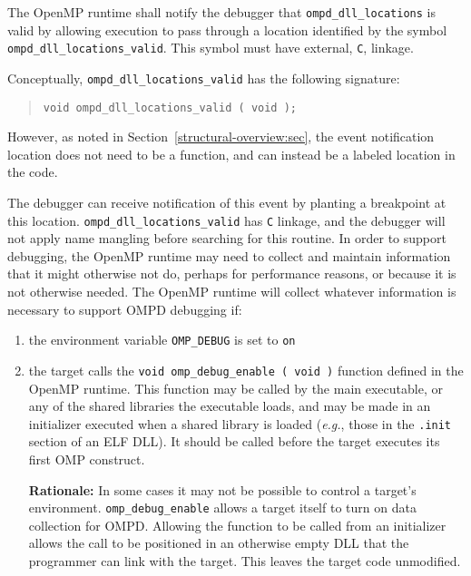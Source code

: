 The OpenMP runtime shall notify the debugger that
\texttt{ompd\_dll\_locations} is valid by allowing execution
to pass through a location identified by the symbol
\texttt{ompd\_dll\_locations\_valid}.
This symbol must have external, \texttt{C}, linkage.

Conceptually, \texttt{ompd\_dll\_locations\_valid} has the following
signature:
\begin{quote}
\begin{lstlisting}
void ompd_dll_locations_valid ( void );
\end{lstlisting}
\end{quote}
However, as noted in Section~\ref{structural-overview:sec},
the event notification location does not need to be a function,
and can instead be a labeled location in the code.

\noindent
The debugger can receive notification of this event by planting
a breakpoint at this location.
\texttt{ompd\_dll\_locations\_valid} has \texttt{C} linkage,
and the debugger will not apply name mangling before searching
for this routine.
In order to support debugging, the OpenMP runtime may need to collect
and maintain information that it might otherwise not do, perhaps
for performance reasons, or because it is not otherwise needed.
The OpenMP runtime will collect whatever information is necessary
to support OMPD debugging if:
\begin{enumerate}
\item
  the environment variable \texttt{OMP\_DEBUG} is set to \texttt{on}
\item
  the target calls the
  \texttt{void omp\_debug\_enable~(~void~)}
  function defined in the OpenMP runtime.
  This function may be called by the main executable, or any of the
  shared libraries the executable loads, and may be made in an
  initializer executed when a shared library is loaded
  (\textit{e.g.}, those in the \texttt{.init} section of an ELF DLL).
  It should be called before the target executes its first OMP
  construct.

  \textbf{Rationale:}
  In some cases it may not be possible to control a target's
  environment.
  \texttt{omp\_debug\_enable} allows a target itself to turn on
  data collection for OMPD.
  Allowing the function to be called from an initializer allows
  the call to be positioned in an otherwise empty DLL that the
  programmer can link with the target.
  This leaves the target code unmodified.
\end{enumerate}


